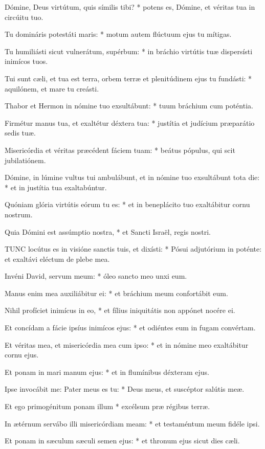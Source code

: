 Dómine, Deus virtútum, quis símilis tibi? * potens es, Dómine, et véritas tua in circúitu tuo.

Tu domináris potestáti maris: * motum autem flúctuum ejus tu mítigas.

Tu humiliásti sicut vulnerátum, supérbum: * in bráchio virtútis tuæ dispersísti inimícos tuos.

Tui sunt cæli, et tua est terra, orbem terræ et plenitúdinem ejus tu fundásti: * aquilónem, et mare tu creásti.

Thabor et Hermon in nómine tuo exsultábunt: * tuum bráchium cum poténtia.

Firmétur manus tua, et exaltétur déxtera tua: * justítia et judícium præparátio sedis tuæ.

Misericórdia et véritas præcédent fáciem tuam: * beátus pópulus, qui scit jubilatiónem.

Dómine, in lúmine vultus tui ambulábunt, et in nómine tuo exsultábunt tota die: * et in justítia tua exaltabúntur.

Quóniam glória virtútis eórum tu es: * et in beneplácito tuo exaltábitur cornu nostrum.

Quia Dómini est assúmptio nostra, * et Sancti Israël, regis nostri.


\lettrine[lines=2]{T}{UNC} locútus es in visióne sanctis tuis, et dixísti: * Pósui adjutórium in poténte: et exaltávi eléctum de plebe mea.

Invéni David, servum meum: * óleo sancto meo unxi eum.

Manus enim mea auxiliábitur ei: * et bráchium meum confortábit eum.

Nihil profíciet inimícus in eo, * et fílius iniquitátis non appónet nocére ei.

Et concídam a fácie ipsíus inimícos ejus: * et odiéntes eum in fugam convértam.

Et véritas mea, et misericórdia mea cum ipso: * et in nómine meo exaltábitur cornu ejus.

Et ponam in mari manum ejus: * et in flumínibus déxteram ejus.

Ipse invocábit me: Pater meus es tu: * Deus meus, et suscéptor salútis meæ.

Et ego primogénitum ponam illum * excélsum præ régibus terræ.

In ætérnum servábo illi misericórdiam meam: * et testaméntum meum fidéle ipsi.

Et ponam in sæculum sæculi semen ejus: * et thronum ejus sicut dies cæli.

